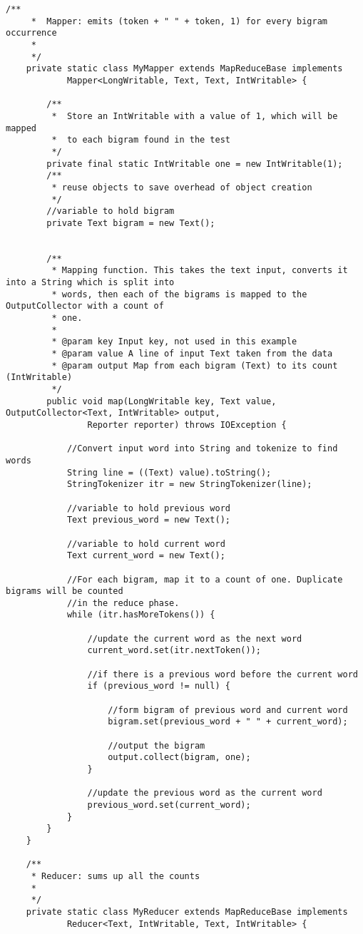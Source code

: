 \documentclass{article} %
\begin{document}
\begin{lstlisting}[style=Java]
	/**
	 *  Mapper: emits (token + " " + token, 1) for every bigram occurrence
	 *
	 */
	private static class MyMapper extends MapReduceBase implements
			Mapper<LongWritable, Text, Text, IntWritable> {

		/**
		 *  Store an IntWritable with a value of 1, which will be mapped 
		 *  to each bigram found in the test
		 */
		private final static IntWritable one = new IntWritable(1);
		/**
		 * reuse objects to save overhead of object creation
		 */
		//variable to hold bigram
		private Text bigram = new Text();


		/**
		 * Mapping function. This takes the text input, converts it into a String which is split into 
		 * words, then each of the bigrams is mapped to the OutputCollector with a count of 
		 * one. 
		 * 
		 * @param key Input key, not used in this example
		 * @param value A line of input Text taken from the data
		 * @param output Map from each bigram (Text) to its count (IntWritable)
		 */
		public void map(LongWritable key, Text value, OutputCollector<Text, IntWritable> output,
				Reporter reporter) throws IOException {
			
			//Convert input word into String and tokenize to find words
			String line = ((Text) value).toString();
			StringTokenizer itr = new StringTokenizer(line);
			
			//variable to hold previous word
			Text previous_word = new Text();
			
			//variable to hold current word
			Text current_word = new Text();
			
			//For each bigram, map it to a count of one. Duplicate bigrams will be counted 
			//in the reduce phase.
			while (itr.hasMoreTokens()) {
				
				//update the current word as the next word
				current_word.set(itr.nextToken());
				
				//if there is a previous word before the current word
				if (previous_word != null) {
					
					//form bigram of previous word and current word
					bigram.set(previous_word + " " + current_word);
					
					//output the bigram
					output.collect(bigram, one);
				}
				
				//update the previous word as the current word
				previous_word.set(current_word);
			}
		}
	}

	/**
	 * Reducer: sums up all the counts
	 *
	 */
	private static class MyReducer extends MapReduceBase implements
			Reducer<Text, IntWritable, Text, IntWritable> {


\end{lstlisting}
\end{document}
